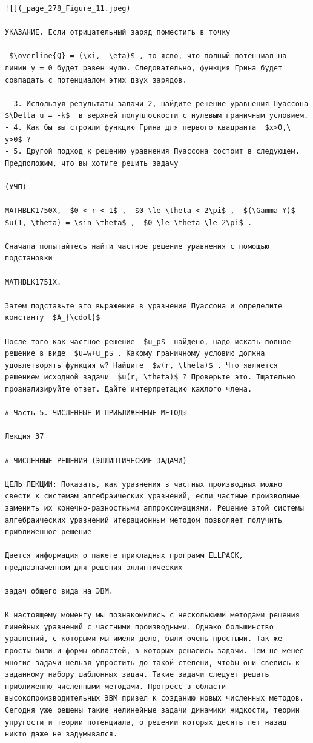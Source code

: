 \documentclass[
]{article}
\begin{document}
\begin{verbatim}
![](_page_278_Figure_11.jpeg)

УКАЗАНИЕ. Если отрицательный заряд поместить в точку

 $\overline{Q} = (\xi, -\eta)$ , то ясво, что полный потенциал на линии y = 0 будет равен нулю. Следовательно, функция Грина будет совпадать с потенциалом этих двух зарядов.

- 3. Используя результаты задачи 2, найдите решение уравнения Пуассона  $\Delta u = -k$  в верхней полуплоскости с нулевым граничным условием.
- 4. Как бы вы строили функцию Грина для первого квадранта  $x>0,\ y>0$ ?
- 5. Другой подход к решению уравнения Пуассона состоит в следующем. Предположим, что вы хотите решить задачу

(УЧП) 

MATHBLK1750X,  $0 < r < 1$ ,  $0 \le \theta < 2\pi$ ,  $(\Gamma Y)$   $u(1, \theta) = \sin \theta$ ,  $0 \le \theta \le 2\pi$ .

Сначала попытайтесь найти частное решение уравнения с помощью подстановки

MATHBLK1751X.

Затем подставьте это выражение в уравнение Пуассона и определите константу  $A_{\cdot}$ 

После того как частное решение  $u_p$  найдено, надо искать полное решение в виде  $u=w+u_p$ . Какому граничному условию должна удовлетворять функция w? Найдите  $w(r, \theta)$ . Что является решением исходной задачи  $u(r, \theta)$ ? Проверьте это. Тщательно проанализируйте ответ. Дайте интерпретацию кажлого члена.

# Часть 5. ЧИСЛЕННЫЕ И ПРИБЛИЖЕННЫЕ МЕТОДЫ

Лекция 37

# ЧИСЛЕННЫЕ РЕШЕНИЯ (ЭЛЛИПТИЧЕСКИЕ ЗАДАЧИ)

ЦЕЛЬ ЛЕКЦИИ: Показать, как уравнения в частных производных можно свести к системам алгебраических уравнений, если частные производные заменить их конечно-разностными аппроксимациями. Решение этой системы алгебраических уравнений итерационным методом позволяет получить приближенное решение

Дается информация о пакете прикладных программ ELLPACK, предназначенном для решения эллиптических

задач общего вида на ЭВМ.

К настоящему моменту мы познакомились с несколькими методами решения линейных уравнений с частными производными. Однако большинство уравнений, с которыми мы имели дело, были очень простыми. Так же просты были и формы областей, в которых решались задачи. Тем не менее многие задачи нельзя упростить до такой степени, чтобы они свелись к заданному набору шаблонных задач. Такие задачи следует решать приближенно численными методами. Прогресс в области высокопроизводительных ЭВМ привел к созданию новых численных методов. Сегодня уже решены такие нелинейные задачи динамики жидкости, теории упругости и теории потенциала, о решении которых десять лет назад никто даже не задумывался.


\end{verbatim}
\end{document}
